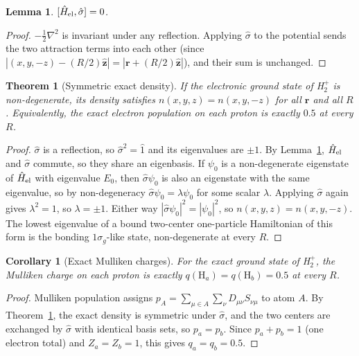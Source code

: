 \documentclass[11pt]{report}
\newtheorem{theorem}{Theorem}
\newtheorem{lemma}{Lemma}
\newtheorem{corollary}{Corollary}
\theoremstyle{definition}
\theoremstyle{remark}
\begin{document}
\begin{lemma}
\label{lem:sym-commute}
$[\hat H_{\rm el}, \hat \sigma] = 0$.
\end{lemma}

\begin{proof}
$-\tfrac12 \nabla^2$ is invariant under any reflection. Applying
$\hat \sigma$ to the potential sends the two attraction terms into each
other (since $|(x,y,-z) - (R/2)\hat{\mathbf z}| = |\mathbf r +
(R/2)\hat{\mathbf z}|$), and their sum is unchanged.
\end{proof}

\begin{theorem}[Symmetric exact density]
\label{thm:h2-sym}
If the electronic ground state of H$_2^+$ is non-degenerate, its density
satisfies $n(x,y,z) = n(x,y,-z)$ for all $\mathbf r$ and all $R$.
Equivalently, the exact electron population on each proton is exactly
$0.5$ at every $R$.
\end{theorem}

\begin{proof}
$\hat \sigma$ is a reflection, so $\hat \sigma^2 = \hat 1$ and its
eigenvalues are $\pm 1$. By Lemma~\ref{lem:sym-commute}, $\hat H_{\rm el}$
and $\hat \sigma$ commute, so they share an eigenbasis. If $\psi_0$ is a
non-degenerate eigenstate of $\hat H_{\rm el}$ with eigenvalue $E_0$, then
$\hat \sigma \psi_0$ is also an eigenstate with the same eigenvalue, so by
non-degeneracy $\hat \sigma \psi_0 = \lambda \psi_0$ for some scalar
$\lambda$. Applying $\hat \sigma$ again gives $\lambda^2 = 1$, so
$\lambda = \pm 1$. Either way
$|\hat \sigma \psi_0|^2 = |\psi_0|^2$, so
$n(x,y,z) = n(x,y,-z)$. The lowest eigenvalue of a bound two-center
one-particle Hamiltonian of this form is the bonding $1\sigma_g$-like
state, non-degenerate at every $R$.
\end{proof}

\begin{corollary}[Exact Mulliken charges]
For the exact ground state of H$_2^+$, the Mulliken charge on each proton
is exactly $q(\mathrm H_a) = q(\mathrm H_b) = 0.5$ at every $R$.
\end{corollary}

\begin{proof}
Mulliken population assigns $p_A = \sum_{\mu \in A} \sum_\nu D_{\mu \nu}
S_{\nu \mu}$ to atom $A$. By Theorem~\ref{thm:h2-sym}, the exact density is
symmetric under $\hat \sigma$, and the two centers are exchanged by
$\hat \sigma$ with identical basis sets, so $p_a = p_b$. Since
$p_a + p_b = 1$ (one electron total) and $Z_a = Z_b = 1$, this gives
$q_a = q_b = 0.5$.
\end{proof}
\end{document}
